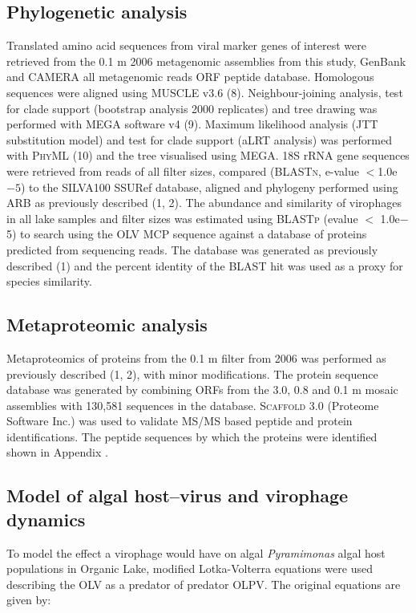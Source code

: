 \subsection{Phylogenetic analysis}
Translated amino acid sequences from viral marker genes of interest were retrieved from the 0.1 \textmu{}m 2006 metagenomic assemblies from this study, GenBank and \ac{CAMERA} all metagenomic reads \ac{ORF} peptide database. 
Homologous sequences were aligned using \textsc{MUSCLE} v3.6 (8). 
Neighbour-joining analysis, test for clade support (bootstrap analysis 2000 replicates) and tree drawing was performed with \ac{MEGA} software v4 (9). 
Maximum likelihood analysis (\textsc{JTT} substitution model) and test for clade support (aLRT analysis) was performed with \textsc{PhyML} (10) and the tree visualised using \ac{MEGA}. 
18S \ac{rRNA} gene sequences were retrieved from reads of all filter sizes, compared (\textsc{BLASTn}, e-value $<$1.0e$-5$) to the \textsc{SILVA100} SSURef database, aligned and phylogeny performed using \textsc{ARB} as previously described (1, 2). 
The abundance and similarity of virophages in all lake samples and filter sizes was estimated using \textsc{BLASTp} (evalue $<$ 1.0e$-$5) to search using the \ac{OLV} \ac{MCP} sequence against a database of proteins predicted from sequencing reads. 
The database was generated as previously described (1) and the percent identity of the \textsc{BLAST} hit was used as a proxy for species similarity. 

\subsection{Metaproteomic analysis}
Metaproteomics of proteins from the 0.1 \textmu{}m filter from 2006 was performed as previously described (1, 2), with minor modifications. 
The protein sequence database was generated by combining ORFs from the 3.0, 0.8 and 0.1 \textmu{}m mosaic assemblies with 130,581 sequences in the database. 
\textsc{Scaffold} 3.0 (Proteome Software Inc.) was used to validate MS/MS based peptide and protein identifications. 
The peptide sequences by which the proteins were identified shown in Appendix .

\subsection[Algal Host--Virus and Virophage Dynamics]{Model of algal host--virus and virophage dynamics}
To model the effect a virophage would have on algal \emph{Pyramimonas} algal host populations in Organic Lake, modified Lotka-Volterra equations were used describing the \ac{OLV} as a predator of predator \ac{OLPV}. 
The original equations are given by:

